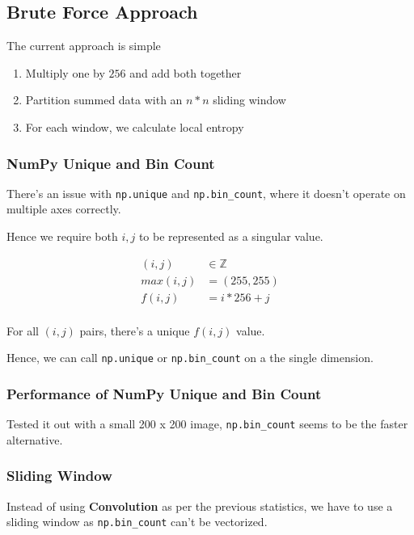 \documentclass[article,oneside]{memoir}
\begin{document}
\subsection{Brute Force Approach}

The current approach is simple

\begin{enumerate}
\item{Multiply one by $256$ and add both together}
\item{Partition summed data with an $n*n$ sliding window}
\item{For each window, we calculate local entropy}
\end{enumerate}

\subsubsection{NumPy Unique and Bin Count}

There's an issue with \verb+np.unique+ and \verb+np.bin_count+, where it doesn't operate on multiple axes correctly.

Hence we require both $i, j$ to be represented as a singular value.

\begin{align*}
(i, j) &\in \mathbb{Z}\\
max(i, j) &= (255, 255)\\
f(i, j)   &= i * 256 + j\\
\end{align*}

For all $(i, j)$ pairs, there's a unique $f(i, j)$ value.

Hence, we can call \verb+np.unique+ or \verb+np.bin_count+ on a the single dimension.

\subsubsection{Performance of NumPy Unique and Bin Count}

Tested it out with a small 200 x 200 image, \verb+np.bin_count+ seems to be the faster alternative.

\subsubsection{Sliding Window}

Instead of using \textbf{Convolution} as per the previous statistics, we have to use a sliding window as \verb+np.bin_count+ can't be vectorized.
\end{document}
